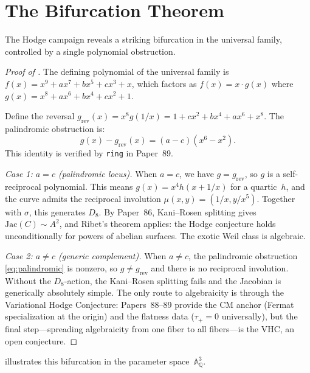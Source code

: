 \documentclass[11pt]{article}
\theoremstyle{plain}
\theoremstyle{definition}
\theoremstyle{remark}
\newcommand{\QQ}{\mathbb{Q}}
\newcommand{\Aff}{\mathbb{A}}
\newcommand{\Jac}{\mathrm{Jac}}
\begin{document}
\section{The Bifurcation Theorem}\label{sec:bifurcation}

The Hodge campaign reveals a striking bifurcation in the universal
family, controlled by a single polynomial obstruction.

\begin{proof}[Proof of ]
The defining polynomial of the universal family is
$f(x) = x^9 + ax^7 + bx^5 + cx^3 + x$, which factors as
$f(x) = x \cdot g(x)$ where
$g(x) = x^8 + ax^6 + bx^4 + cx^2 + 1$.

Define the reversal $g_{\mathrm{rev}}(x) = x^8 g(1/x)
= 1 + cx^2 + bx^4 + ax^6 + x^8$.  The palindromic obstruction is:
\begin{equation}\label{eq:palindromic}
  g(x) - g_{\mathrm{rev}}(x) = (a - c)(x^6 - x^2).
\end{equation}
This identity is verified by \texttt{ring} in Paper~89.

\medskip
\noindent\textit{Case 1: $a = c$ (palindromic locus).}\;
When $a = c$, we have $g = g_{\mathrm{rev}}$, so $g$ is a
self-reciprocal polynomial.  This means $g(x) = x^4 h(x + 1/x)$
for a quartic~$h$, and the curve admits the reciprocal involution
$\mu(x,y) = (1/x, y/x^5)$.  Together with $\sigma$, this generates
$D_8$.  By Paper~86, Kani--Rosen splitting gives
$\Jac(C) \sim A^2$, and Ribet's theorem \cite{ribet83} applies:
the Hodge conjecture holds unconditionally for powers of abelian
surfaces.  The exotic Weil class is algebraic.

\medskip
\noindent\textit{Case 2: $a \neq c$ (generic complement).}\;
When $a \neq c$, the palindromic obstruction \eqref{eq:palindromic}
is nonzero, so $g \neq g_{\mathrm{rev}}$ and there is no reciprocal
involution.  Without the $D_8$-action, the Kani--Rosen splitting
fails and the Jacobian is generically absolutely simple.  The only
route to algebraicity is through the Variational Hodge Conjecture:
Papers~88--89 provide the CM anchor (Fermat specialization at the
origin) and the flatness data ($\tau_+ = 0$ universally), but the
final step---spreading algebraicity from one fiber to all
fibers---is the VHC, an open conjecture.
\end{proof}

 illustrates this bifurcation in the
parameter space~$\Aff^3_{\QQ}$.
\end{document}
